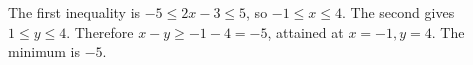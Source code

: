The first inequality is $-5\le2x-3\le5$, so $-1\le x\le4$. The second gives $1\le y\le4$. Therefore $x-y\ge-1-4=-5$, attained at $x=-1,y=4$. The minimum is $\boxed{-5}$.
